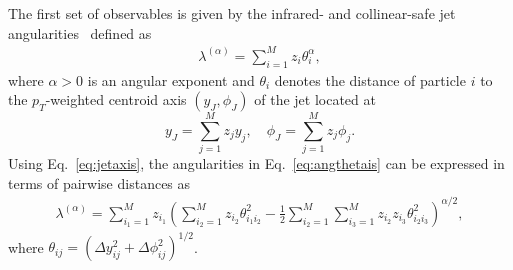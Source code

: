 \documentclass[aps,prd,twocolumn, superscriptaddress,preprintnumbers, nofootinbib,longbibliography,floatfix]{revtex4-2}
\begin{document}
The first set of observables is given by the infrared- and collinear-safe jet angularities~\cite{Ellis:2010rwa,Larkoski:2014pca} defined as
%
\begin{align}
\lambda^{(\alpha)} = \sum_{i=1}^Mz_i\theta_i^\alpha,
\label{eq:angthetais}
\end{align}
%
where $\alpha>0$ is an angular exponent and $\theta_{i}$ denotes the distance of particle $i$ to the $p_T$-weighted centroid axis $(y_J,\phi_J)$ of the jet located at
%
\begin{equation}
y_J=\sum_{j=1}^M z_j y_j,\quad\phi_J=\sum_{j=1}^M z_j\phi_j.
\label{eq:jetaxis}
\end{equation}
%
Using Eq.~\eqref{eq:jetaxis}, the angularities in Eq.~\eqref{eq:angthetais} can be expressed in terms of pairwise distances as
%
\begin{align}
\lambda^{(\alpha)} =\sum_{i_1=1}^M z_{i_1} \left(\sum_{i_2 = 1}^Mz_{i_2}\theta_{i_1i_2}^2 - \frac12 \sum_{i_2 = 1}^M\sum_{i_3 = 1}^M z_{i_2}z_{i_3} \theta_{i_2i_3}^2\right)^{\alpha/2},
\label{eq:angthetaijs}
\end{align}
%
where $\theta_{ij} = (\Delta y_{ij}^2 + \Delta \phi_{ij}^2)^{1/2}$.
\end{document}
